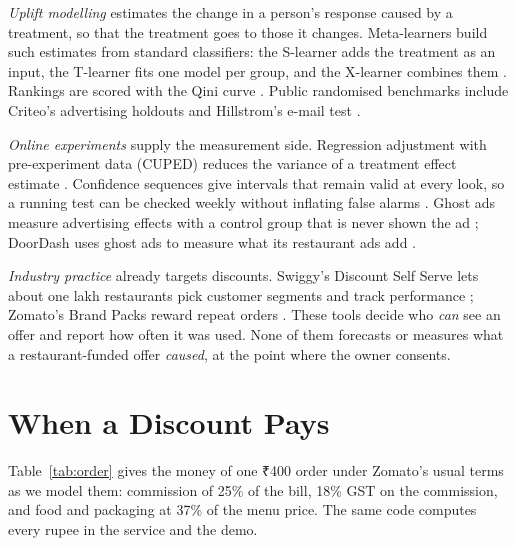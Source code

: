 \documentclass[conference]{IEEEtran}
\begin{document}
\emph{Uplift modelling} estimates the change in a person's response caused by a treatment, so that
the treatment goes to those it changes. Meta-learners build such estimates from standard classifiers:
the S-learner adds the treatment as an input, the T-learner fits one model per group, and the X-learner
combines them \cite{kunzel}. Rankings are scored with the Qini curve \cite{radcliffe}. Public randomised
benchmarks include Criteo's advertising holdouts \cite{criteo} and Hillstrom's e-mail test \cite{hillstrom}.

\emph{Online experiments} supply the measurement side. Regression adjustment with pre-experiment data
(CUPED) reduces the variance of a treatment effect estimate \cite{cuped}. Confidence sequences give
intervals that remain valid at every look, so a running test can be checked weekly without inflating
false alarms \cite{howard}. Ghost ads measure advertising effects with a control group that is never
shown the ad \cite{ghostads}; DoorDash uses ghost ads to measure what its restaurant ads add \cite{doordash}.

\emph{Industry practice} already targets discounts. Swiggy's Discount Self Serve lets about one lakh
restaurants pick customer segments and track performance \cite{swiggy}; Zomato's Brand Packs reward
repeat orders \cite{brandpacks}. These tools decide who \emph{can} see an offer and report how often it
was used. None of them forecasts or measures what a restaurant-funded offer \emph{caused}, at the point
where the owner consents.

\section{When a Discount Pays}
\label{sec:money}

Table~\ref{tab:order} gives the money of one ₹400 order under Zomato's usual terms as we model them:
commission of 25\% of the bill, 18\% GST on the commission, and food and packaging at 37\% of the menu
price. The same code computes every rupee in the service and the demo.
\end{document}

